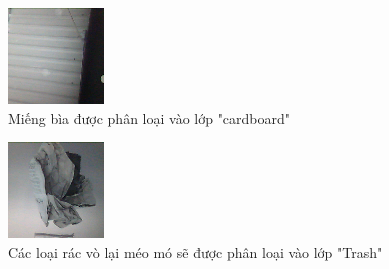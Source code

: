 \begin{figure}[H]
    \centering
    \includegraphics[width=\linewidth]{images/Quanh/cardboard.bmp}
    \caption{ Miếng bìa được phân loại vào lớp "cardboard" }
    \label{fig:Dcardboard}
\end{figure}

\begin{figure}[H]
    \centering
    \includegraphics[width=\linewidth]{images/Quanh/othertrash.bmp}
    \caption{ Các loại rác vò lại méo mó sẽ được phân loại vào lớp "Trash" }
    \label{fig:Dtrash}
\end{figure}

